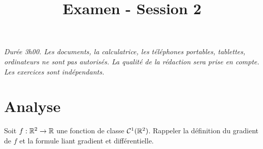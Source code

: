 \documentclass{tp_um}
\title{\Large \sffamily\bfseries Examen - Session 2}
\begin{document}
\maketitle

\bigskip
\bigskip

\textit{Durée 3h00. Les documents, la calculatrice, les téléphones portables, tablettes, ordinateurs ne sont pas autorisés. La qualité de la rédaction sera prise en compte. Les exercices sont indépendants.} 

\bigskip
\bigskip

\section{Analyse}

 Soit $f:\mathbb{R}^2 \to \mathbb{R}$ une fonction de classe $\mathcal C^1(\mathbb{R}^2)$. Rappeler la définition du gradient de $f$ et la formule liant gradient et différentielle.

\end{document}
